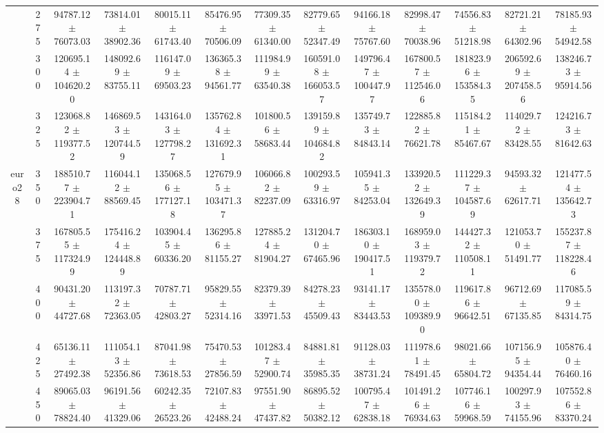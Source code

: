 \begin{table}[h]
{\begin{tabular}{
        ccccccccccccc}
 & 275& 94787.12 $\pm$ 76073.03& 73814.01 $\pm$ 38902.36& 80015.11 $\pm$ 61743.40& 85476.95 $\pm$ 70506.09& 77309.35 $\pm$ 61340.00& 82779.65 $\pm$ 52347.49& 94166.18 $\pm$ 75767.60& 82998.47 $\pm$ 70038.96& 74556.83 $\pm$ 51218.98& 82721.21 $\pm$ 64302.96& 78185.93 $\pm$ 54942.58 \\ 
 & 300& 120695.14 $\pm$ 104620.20& 148092.69 $\pm$ 83755.11& 116147.09 $\pm$ 69503.23& 136365.38 $\pm$ 94561.77& 111984.99 $\pm$ 63540.38& 160591.08 $\pm$ 166053.57& 149796.47 $\pm$ 100447.97& 167800.57 $\pm$ 112546.06& 181823.96 $\pm$ 153584.35& 206592.69 $\pm$ 207458.56& 138246.73 $\pm$ 95914.56 \\ 
 & 325& 123068.82 $\pm$ 119377.52& 146869.53 $\pm$ 120744.59& 143164.03 $\pm$ 127798.27& 135762.84 $\pm$ 131692.31& 101800.56 $\pm$ 58683.44& 139159.89 $\pm$ 104684.82& 135749.73 $\pm$ 84843.14& 122885.82 $\pm$ 76621.78& 115184.21 $\pm$ 85467.67& 114029.72 $\pm$ 83428.55& 124216.73 $\pm$ 81642.63 \\ 
\multirow{4}{*}{euro28}& 350& 188510.77 $\pm$ 223904.71& 116044.12 $\pm$ 88569.45& 135068.56 $\pm$ 177127.18& 127679.95 $\pm$ 103471.37& 106066.82 $\pm$ 82237.09& 100293.59 $\pm$ 63316.97& 105941.35 $\pm$ 84253.04& 133920.52 $\pm$ 132649.39& 111229.37 $\pm$ 104587.69& 94593.32 $\pm$ 62617.71& 121477.54 $\pm$ 135642.73 \\ 
 & 375& 167805.55 $\pm$ 117324.99& 175416.24 $\pm$ 124448.89& 103904.45 $\pm$ 60336.20& 136295.86 $\pm$ 81155.27& 127885.24 $\pm$ 81904.27& 131204.70 $\pm$ 67465.96& 186303.10 $\pm$ 190417.51& 168959.03 $\pm$ 119379.72& 144427.32 $\pm$ 110508.11& 121053.70 $\pm$ 51491.77& 155237.87 $\pm$ 118228.46 \\ 
 & 400& 90431.20 $\pm$ 44727.68& 113197.32 $\pm$ 72363.05& 70787.71 $\pm$ 42803.27& 95829.55 $\pm$ 52314.16& 82379.39 $\pm$ 33971.53& 84278.23 $\pm$ 45509.43& 93141.17 $\pm$ 83443.53& 135578.00 $\pm$ 109389.90& 119617.86 $\pm$ 96642.51& 96712.69 $\pm$ 67135.85& 117085.59 $\pm$ 84314.75 \\ 
 & 425& 65136.11 $\pm$ 27492.38& 111054.13 $\pm$ 52356.86& 87041.98 $\pm$ 73618.53& 75470.53 $\pm$ 27856.59& 101283.47 $\pm$ 52900.74& 84881.81 $\pm$ 35985.35& 91128.03 $\pm$ 38731.24& 111978.61 $\pm$ 78491.45& 98021.66 $\pm$ 65804.72& 107156.95 $\pm$ 94354.44& 105876.40 $\pm$ 76460.16 \\ 
 & 450& 89065.03 $\pm$ 78824.40& 96191.56 $\pm$ 41329.06& 60242.35 $\pm$ 26523.26& 72107.83 $\pm$ 42488.24& 97551.90 $\pm$ 47437.82& 86895.52 $\pm$ 50382.12& 100795.47 $\pm$ 62838.18& 101491.26 $\pm$ 76934.63& 107746.16 $\pm$ 59968.59& 100297.93 $\pm$ 74155.96& 107552.86 $\pm$ 83370.24 \\ 

\end{tabular}}
\end{table}
